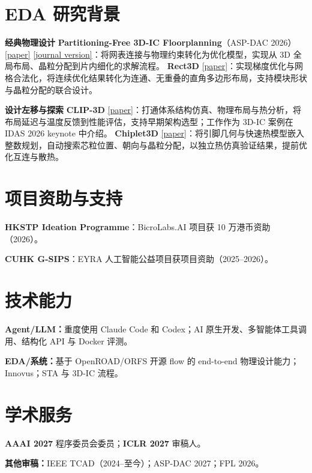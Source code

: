 \documentclass[11pt,a4paper,fontset=none]{ctexart}
\begin{document}
\section*{EDA 研究背景}
{\small
{\color{accent}\textbf{经典物理设计}}\quad
\textbf{Partitioning-Free 3D-IC Floorplanning}（ASP-DAC 2026）\href{https://flians.github.io/pdf/3DFloorplan.pdf}{[paper]} \href{https://arxiv.org/abs/2609.13157}{[journal version]}：将网表连接与物理约束转化为优化模型，实现从 3D 全局布局、晶粒分配到片内细化的求解流程。
\textbf{Rect3D} \href{https://arxiv.org/abs/2609.18946}{[paper]}：实现梯度优化与网格合法化，将连续优化结果转化为连通、无重叠的直角多边形布局，支持模块形状与晶粒分配的联合设计。\par
\vspace{3pt}
{\color{accent}\textbf{设计左移与探索}}\quad
\textbf{CLIP-3D} \href{https://arxiv.org/abs/2607.12788}{[paper]}：打通体系结构仿真、物理布局与热分析，将布局延迟与温度反馈到性能评估，支持早期架构选型；工作作为 3D-IC 案例在 IDAS 2026 keynote 中介绍。
\textbf{Chiplet3D} \href{https://arxiv.org/abs/2607.09742}{[paper]}：将引脚几何与快速热模型嵌入整数规划，自动搜索芯粒位置、朝向与晶粒分配，以独立热仿真验证结果，提前优化互连与散热。\par
}

\section*{项目资助与支持}
{\small
\textbf{HKSTP Ideation Programme}：BicroLabs.AI 项目获 10 万港币资助（2026）。\par
\textbf{CUHK G-SIPS}：EYRA 人工智能公益项目获项目资助（2025--2026）。\par
}

\section*{技术能力}
{\small
\textbf{Agent/LLM：}重度使用 Claude Code 和 Codex；AI 原生开发、多智能体工具调用、结构化 API 与 Docker 评测。\par
\vspace{2pt}
\textbf{EDA/系统：}基于 OpenROAD/ORFS 开源 flow 的 end-to-end 物理设计能力；Innovus；STA 与 3D-IC 流程。\par
}

\section*{学术服务}
{\small
\textbf{AAAI 2027} 程序委员会委员；\textbf{ICLR 2027} 审稿人。\par
\textbf{其他审稿：}IEEE TCAD（2024--至今）；ASP-DAC 2027；FPL 2026。\par
}
\end{document}
